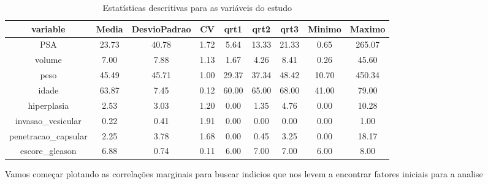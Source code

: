 \documentclass[runningheads]{llncs}\usepackage[]{graphicx}\usepackage[]{color}
\newenvironment{knitrout}{}{} %
\begin{document}
{\begin{table}[H]
\begin{knitrout}
\begin{table}
\caption{\label{tab:unnamed-chunk-4}Estatísticas descritivas para as variáveis do estudo}
\centering
\fontsize{9}{11}\selectfont
\begin{tabular}[t]{ccccccccc}
\toprule
variable & Media & DesvioPadrao & CV & qrt1 & qrt2 & qrt3 & Minimo & Maximo\\
\midrule
\rowcolor{gray!6}  PSA & 23.73 & 40.78 & 1.72 & 5.64 & 13.33 & 21.33 & 0.65 & 265.07\\
volume & 7.00 & 7.88 & 1.13 & 1.67 & 4.26 & 8.41 & 0.26 & 45.60\\
\rowcolor{gray!6}  peso & 45.49 & 45.71 & 1.00 & 29.37 & 37.34 & 48.42 & 10.70 & 450.34\\
idade & 63.87 & 7.45 & 0.12 & 60.00 & 65.00 & 68.00 & 41.00 & 79.00\\
\rowcolor{gray!6}  hiperplasia & 2.53 & 3.03 & 1.20 & 0.00 & 1.35 & 4.76 & 0.00 & 10.28\\
\addlinespace
invasao\_vesicular & 0.22 & 0.41 & 1.91 & 0.00 & 0.00 & 0.00 & 0.00 & 1.00\\
\rowcolor{gray!6}  penetracao\_capsular & 2.25 & 3.78 & 1.68 & 0.00 & 0.45 & 3.25 & 0.00 & 18.17\\
escore\_gleason & 6.88 & 0.74 & 0.11 & 6.00 & 7.00 & 7.00 & 6.00 & 8.00\\
\bottomrule
\end{tabular}
\end{table}


\end{knitrout}

\end{table}}

Vamos começar plotando as correlações marginais para buscar indicios que nos levem a encontrar fatores iniciais para a analise  
\end{document}
